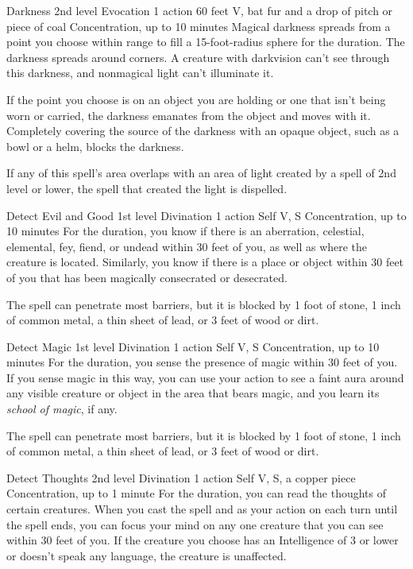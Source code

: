 \documentclass[10pt,a4paper,twoside,bg=print,twocolumn,openany,nodeprecatedcode]{dndbook}
\begin{document}


\DndSpellHeader%
{Darkness}
{2nd level Evocation}
{1 action}
{60 feet}
{V, bat fur and a drop of pitch or piece of coal}
{Concentration, up to 10 minutes}
Magical darkness spreads from a point you choose within range to fill a 15-foot-radius sphere for the duration. The darkness spreads around corners. A creature with darkvision can't see through this darkness, and nonmagical light can't illuminate it.

If the point you choose is on an object you are holding or one that isn't being worn or carried, the darkness emanates from the object and moves with it. Completely covering the source of the darkness with an opaque object, such as a bowl or a helm, blocks the darkness.

If any of this spell's area overlaps with an area of light created by a spell of 2nd level or lower, the spell that created the light is dispelled.



\DndSpellHeader%
{Detect Evil and Good}
{1st level Divination}
{1 action}
{Self}
{V, S}
{Concentration, up to 10 minutes}
For the duration, you know if there is an aberration, celestial, elemental, fey, fiend, or undead within 30 feet of you, as well as where the creature is located. Similarly, you know if there is a place or object within 30 feet of you that has been magically consecrated or desecrated.

The spell can penetrate most barriers, but it is blocked by 1 foot of stone, 1 inch of common metal, a thin sheet of lead, or 3 feet of wood or dirt.



\DndSpellHeader%
{Detect Magic}
{1st level Divination}
{1 action}
{Self}
{V, S}
{Concentration, up to 10 minutes}
For the duration, you sense the presence of magic within 30 feet of you. If you sense magic in this way, you can use your action to see a faint aura around any visible creature or object in the area that bears magic, and you learn its \textit{school of magic}, if any.

The spell can penetrate most barriers, but it is blocked by 1 foot of stone, 1 inch of common metal, a thin sheet of lead, or 3 feet of wood or dirt.



\DndSpellHeader%
{Detect Thoughts}
{2nd level Divination}
{1 action}
{Self}
{V, S, a copper piece}
{Concentration, up to 1 minute}
For the duration, you can read the thoughts of certain creatures. When you cast the spell and as your action on each turn until the spell ends, you can focus your mind on any one creature that you can see within 30 feet of you. If the creature you choose has an Intelligence of 3 or lower or doesn't speak any language, the creature is unaffected.
\end{document}
